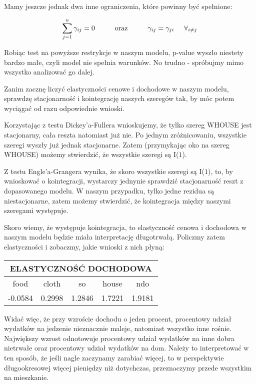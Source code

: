 \documentclass[11pt,a4paper]{report}
\begin{document}
Mamy jeszcze jednak dwa inne ograniczenia, które powinny być spełnione:

$$
\sum_{j=1}^n \gamma_{ij}=0 \hspace{1cm} \textrm{oraz} \hspace{1cm} \gamma_{ij}=\gamma_{ji} \hspace{0.5cm} \forall_{i\neq j}
$$

Robiąc test na powyższe restrykcje w naszym modelu, p-value wyszło niestety bardzo małe, czyli model nie spełnia warunków. No trudno - spróbujmy mimo wszystko analizować go dalej.

\bigskip

Zanim zacznę liczyć elastyczności cenowe i dochodowe w naszym modelu, sprawdzę stacjonarność i kointegrację naszych szeregów tak, by móc potem wyciągać od razu odpowiednie wnioski.

Korzystając z testu Dickey'a-Fullera wnioskujemy, że tylko szereg WHOUSE jest stacjonarny, cała reszta natomiast już nie. Po jednym zróżnicowaniu, wszystkie szeregi wyszły już jednak stacjonarne. Zatem (przymykając oko na szereg WHOUSE) możemy stwierdzić, że wszystkie szeregi są I($1$).

\bigskip

Z testu Engle'a-Grangera wynika, że skoro wszystkie szeregi są I($1$), to, by wnioskować o kointegracji, wystarczy jednynie sprawdzić stacjonarność reszt z dopasowanego modelu. W naszym przypadku, tylko jedne rezidua są niestacjonarne, zatem możemy stwierdzić, że kointegracja między naszymi szeregami występuje.

\bigskip

Skoro wiemy, że występuje kointegracja, to elastyczność cenowa i dochodowa w naszym modelu będzie miała interpretację długotrwałą. Policzmy zatem elastyczności i zobaczmy, jakie wnioski z nich płyną:

\bigskip

\begin{center}
\begin{tabular}{|c|c|c|c|c|}
\hline
\multicolumn{5}{|c|}{ELASTYCZNOŚĆ DOCHODOWA}  \\ \hline 
food  & cloth  & so  & house  & ndo  \\ \hline
-0.0584  & 0.2998  & 1.2846  & 1.7221  & 1.9181  \\ \hline
\end{tabular}
\end{center}

\bigskip

Widać więc, że przy wzroście dochodu o jeden procent, procentowy udział wydatków na jedzenie nieznacznie maleje, natomiast wszystko inne rośnie. Największy wzrost odnotowuje procentowy udział wydatków na inne dobra nietrwałe oraz procentowy udział wydatków na dom. Należy to interpretować w ten sposób, że jeśli nagle zaczynamy zarabiać więcej, to w perspektywie długookresowej więcej pieniędzy niż dotychczas, przeznaczymy przede wszystkim na mieszkanie.
\end{document}
